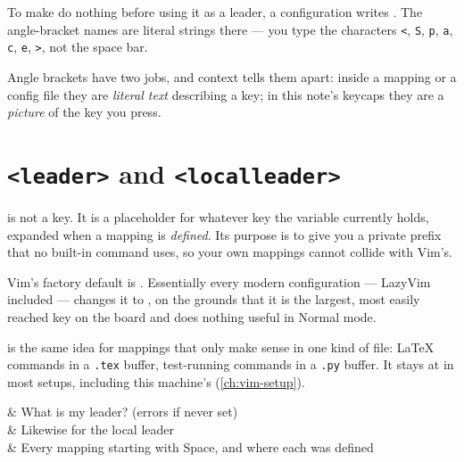 \begin{eg}
	To make  do nothing before using it as a leader, a configuration
	writes . The angle-bracket names
	are literal strings there --- you type the characters
	\texttt{<}, \texttt{S}, \texttt{p}, \texttt{a}, \texttt{c}, \texttt{e},
	\texttt{>}, not the space bar.
\end{eg}

\begin{moral}
	Angle brackets have two jobs, and context tells them apart: inside a mapping
	or a config file they are \emph{literal text} describing a key; in this note's
	keycaps they are a \emph{picture} of the key you press.
\end{moral}

\section{\texorpdfstring{\texttt{<leader>} and \texttt{<localleader>}}{leader and localleader}}\label{sec:vim-leader}

\begin{definition}[Leader]
	 is not a key. It is a placeholder for whatever key the variable
	 currently holds, expanded when a mapping is \emph{defined}.
	Its purpose is to give you a private prefix that no built-in command uses, so
	your own mappings cannot collide with Vim's.
\end{definition}

Vim's factory default is \key{\textbackslash}. Essentially every modern
configuration --- LazyVim included --- changes it to , on the
grounds that it is the largest, most easily reached key on the board and does
nothing useful in Normal mode.

 is the same idea for mappings that only make sense in one
kind of file: \LaTeX{} commands in a \texttt{.tex} buffer, test-running commands
in a \texttt{.py} buffer. It stays at \key{\textbackslash} in most setups,
including this machine's (\autoref{ch:vim-setup}).

\begin{keys}[0.30]
	        & What is my leader? (errors if never set)       \\
	   & Likewise for the local leader                  \\
	  & Every mapping starting with Space, and where each was defined \\
\end{keys}

